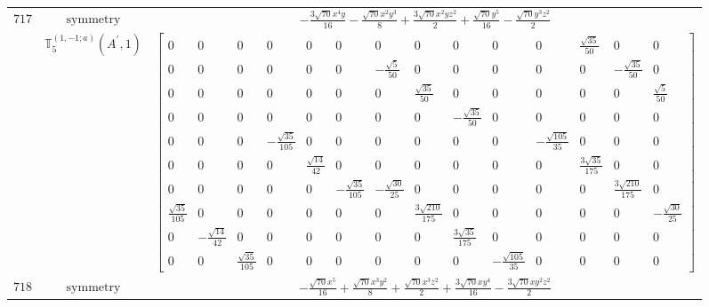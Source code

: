 \documentclass[fleqn,8pt,landscape]{jsarticle}
\begin{document}
\begin{longtable}{ccc}
$ 717 $ & $ \text{symmetry} $ & $ - \frac{3 \sqrt{70} x^{4} y}{16} - \frac{\sqrt{70} x^{2} y^{3}}{8} + \frac{3 \sqrt{70} x^{2} y z^{2}}{2} + \frac{\sqrt{70} y^{5}}{16} - \frac{\sqrt{70} y^{3} z^{2}}{2} $ \\
$  $ & $ \mathbb{T}_{5}^{(1,-1;a)}(A^{\prime},1) $ & $ \begin{bmatrix} 0 & 0 & 0 & 0 & 0 & 0 & 0 & 0 & 0 & 0 & 0 & \frac{\sqrt{35}}{50} & 0 & 0 \\ 0 & 0 & 0 & 0 & 0 & 0 & - \frac{\sqrt{5}}{50} & 0 & 0 & 0 & 0 & 0 & - \frac{\sqrt{35}}{50} & 0 \\ 0 & 0 & 0 & 0 & 0 & 0 & 0 & \frac{\sqrt{35}}{50} & 0 & 0 & 0 & 0 & 0 & \frac{\sqrt{5}}{50} \\ 0 & 0 & 0 & 0 & 0 & 0 & 0 & 0 & - \frac{\sqrt{35}}{50} & 0 & 0 & 0 & 0 & 0 \\ 0 & 0 & 0 & - \frac{\sqrt{35}}{105} & 0 & 0 & 0 & 0 & 0 & 0 & - \frac{\sqrt{105}}{35} & 0 & 0 & 0 \\ 0 & 0 & 0 & 0 & \frac{\sqrt{14}}{42} & 0 & 0 & 0 & 0 & 0 & 0 & \frac{3 \sqrt{35}}{175} & 0 & 0 \\ 0 & 0 & 0 & 0 & 0 & - \frac{\sqrt{35}}{105} & - \frac{\sqrt{30}}{25} & 0 & 0 & 0 & 0 & 0 & \frac{3 \sqrt{210}}{175} & 0 \\ \frac{\sqrt{35}}{105} & 0 & 0 & 0 & 0 & 0 & 0 & \frac{3 \sqrt{210}}{175} & 0 & 0 & 0 & 0 & 0 & - \frac{\sqrt{30}}{25} \\ 0 & - \frac{\sqrt{14}}{42} & 0 & 0 & 0 & 0 & 0 & 0 & \frac{3 \sqrt{35}}{175} & 0 & 0 & 0 & 0 & 0 \\ 0 & 0 & \frac{\sqrt{35}}{105} & 0 & 0 & 0 & 0 & 0 & 0 & - \frac{\sqrt{105}}{35} & 0 & 0 & 0 & 0 \end{bmatrix} $ \\ \hline
$ 718 $ & $ \text{symmetry} $ & $ - \frac{\sqrt{70} x^{5}}{16} + \frac{\sqrt{70} x^{3} y^{2}}{8} + \frac{\sqrt{70} x^{3} z^{2}}{2} + \frac{3 \sqrt{70} x y^{4}}{16} - \frac{3 \sqrt{70} x y^{2} z^{2}}{2} $ \\

\end{longtable}
\end{document}
